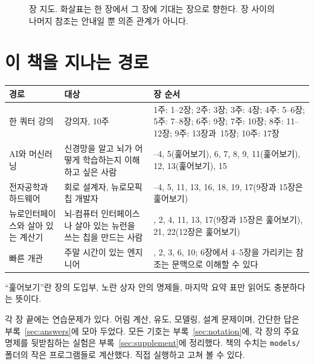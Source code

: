\begin{figure}[h]
\caption{장 지도. 화살표는 한 장에서 그 장에 기대는 장으로 향한다. 장 사이의 나머지 참조는 안내일 뿐 의존 관계가 아니다.}
\label{fig:roadmap}
\end{figure}

\section*{이 책을 지나는 경로}

\begin{center}
\footnotesize
\setlength{\tabcolsep}{4pt}
\renewcommand{\arraystretch}{1.2}
\begin{tabular}{>{\raggedright}p{3.0cm}>{\raggedright}p{3.9cm}>{\raggedright\arraybackslash}p{6.4cm}}
\toprule
경로 & 대상 & 장 순서 \\
\midrule
한 쿼터 강의 & 강의자, 10주 & 1주: 1--2장; 2주: 3장; 3주: 4장; 4주: 5--6장; 5주: 7--8장; 6주: 9장; 7주: 10장; 8주: 11--12장; 9주: 13장과~15장; 10주: 17장 \\
AI와 머신러닝 & 신경망을 알고 뇌가 어떻게 학습하는지 이해하고 싶은 사람 & 1--4, 5(훑어보기), 6, 7, 8, 9, 11(훑어보기), 12, 13(훑어보기), 15 \\
전자공학과 하드웨어 & 회로 설계자, 뉴로모픽 칩 개발자 & 1--4, 5, 11, 13, 16, 18, 19, 17(9장과 15장은 훑어보기) \\
뉴로인터페이스와 살아 있는 계산기 & 뇌-컴퓨터 인터페이스나 살아 있는 뉴런을 쓰는 칩을 만드는 사람 & 1, 2, 4, 11, 13, 17(9장과 15장은 훑어보기), 21, 22(12장은 훑어보기) \\
빠른 개관 & 주말 시간이 있는 엔지니어 & 1, 2, 3, 6, 10; 6장에서 4--5장을 가리키는 참조는 문맥으로 이해할 수 있다 \\
\bottomrule
\end{tabular}
\end{center}

“훑어보기”란 장의 도입부, 노란 상자 안의 명제들, 마지막 요약 표만 읽어도 충분하다는 뜻이다.

각 장 끝에는 연습문제가 있다. 어림 계산, 유도, 모델링, 설계 문제이며, 간단한 답은 부록~\ref{sec:answers}에 모아 두었다. 모든 기호는 부록~\ref{sec:notation}에, 각 장의 주요 명제를 뒷받침하는 실험은 부록~\ref{sec:supplement}에 정리했다. 책의 수치는 \texttt{models/} 폴더의 작은 프로그램들로 계산했다. 직접 실행하고 고쳐 볼 수 있다.
